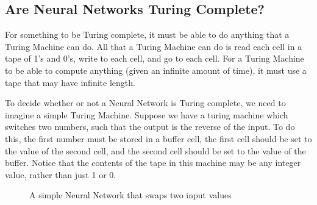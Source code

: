 \documentclass{article}
\begin{document}
	\subsection{Are Neural Networks Turing Complete?}

		For something to be Turing complete, it must be able to do anything that a Turing Machine can do. All that a Turing Machine can do is read each cell in a tape of 1's and 0's, write to each cell, and go to each cell. For a Turing Machine to be able to compute anything (given an infinite amount of time), it must use a tape that may have infinite length. 
		
		To decide whether or not a Neural Network is Turing complete, we need to imagine a simple Turing Machine. Suppose we have a turing machine which switches two numbers, such that the output is the reverse of the input. To do this, the first number must be stored in a buffer cell, the first cell should be set to the value of the second cell, and the second cell should be set to the value of the buffer. Notice that the contents of the tape in this machine may be any integer value, rather than just 1 or 0. 
		
		\newpage
		\begin{figure}
			
			\centering
			
			\caption{A simple Neural Network that swaps two input values}
			
		\end{figure}
		
\end{document}

